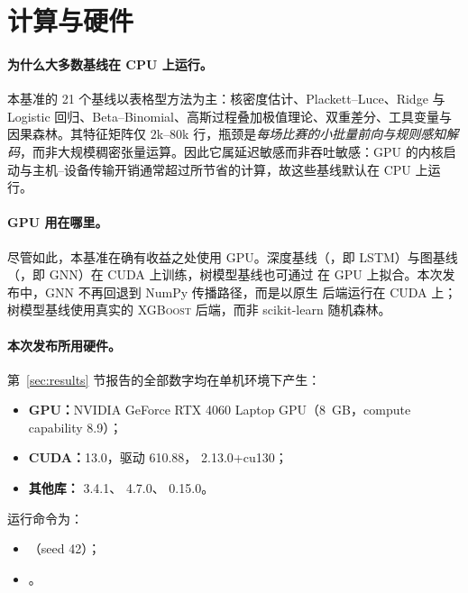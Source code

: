 \section{计算与硬件}
\label{sec:compute}

\paragraph{为什么大多数基线在 CPU 上运行。}本基准的 21 个基线以表格型方法为主：核密度估计、Plackett--Luce、Ridge 与 Logistic 回归、Beta--Binomial、高斯过程叠加极值理论、双重差分、工具变量与因果森林。其特征矩阵仅 $2$k--$80$k 行，瓶颈是\emph{每场比赛的小批量前向与规则感知解码}，而非大规模稠密张量运算。因此它属延迟敏感而非吞吐敏感：GPU 的内核启动与主机--设备传输开销通常超过所节省的计算，故这些基线默认在 CPU 上运行。

\paragraph{GPU 用在哪里。}尽管如此，本基准在确有收益之处使用 GPU。深度基线（，即 LSTM）与图基线（，即 GNN）在 CUDA 上训练，树模型基线也可通过  在 GPU 上拟合。本次发布中，GNN 不再回退到 NumPy 传播路径，而是以原生  后端运行在 CUDA 上；树模型基线使用真实的 \textsc{XGBoost} 后端，而非 scikit-learn 随机森林。

\paragraph{本次发布所用硬件。}第~\ref{sec:results} 节报告的全部数字均在单机环境下产生：
\begin{itemize}
  \item \textbf{GPU：}NVIDIA GeForce RTX 4060 Laptop GPU（8~GB，compute capability 8.9）；
  \item \textbf{CUDA：}13.0，驱动 610.88， 2.13.0+cu130；
  \item \textbf{其他库：} 3.4.1、 4.7.0、 0.15.0。
\end{itemize}
运行命令为：
\begin{itemize}
  \item {}（seed 42）；
  \item {}。
\end{itemize}

